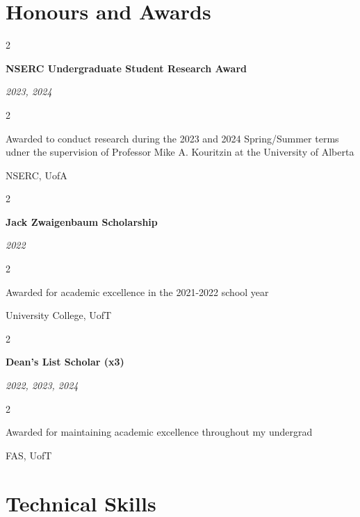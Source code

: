 \documentclass[10pt, letterpaper]{article}
\newenvironment{twocolentry}[2][]{
    \onecolentry
    \def\secondColumn{#2}
    \setcolumnwidth{\fill, 4.5 cm}
    \begin{paracol}{2}
}{
    \switchcolumn \raggedleft \secondColumn
    \end{paracol}
    \endonecolentry
} %
\begin{document}
     \vspace{0.2 cm}

    \section{Honours and Awards}





    \begin{twocolentry}{   
            
        \textit{2023, 2024}}
            \textbf{NSERC Undergraduate Student Research Award}
        \end{twocolentry}

        \vspace{0.10 cm}
    \begin{twocolentry}{      NSERC, UofA}
        Awarded to conduct research during the 2023 and 2024 Spring/Summer terms udner the supervision of Professor Mike A. Kouritzin at the University of Alberta
    \end{twocolentry}

    \vspace{0.2cm}

    \begin{twocolentry}
       { \textit{2022}}
        \textbf{Jack Zwaigenbaum Scholarship}
    \end{twocolentry}
    \vspace{0.1cm}
    \begin{twocolentry}
        {University College, UofT}
        Awarded for academic excellence in the 2021-2022 school year
    \end{twocolentry}

    \vspace{0.2cm}
    \begin{twocolentry}{
        \textit{2022, 2023, 2024}
    }
        \textbf{Dean's List Scholar (x3)}
    \end{twocolentry}
    \vspace{0.1cm}
    \begin{twocolentry}
        {
            FAS, UofT
        }
        Awarded for maintaining academic excellence throughout my undergrad
    \end{twocolentry}

    \section{Technical Skills}
\end{document}
